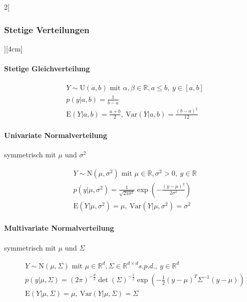 \documentclass[8pt]{extarticle}
\begin{document}
\begin{multicols}{2}[\subsubsection{Stetige Verteilungen}][4cm]

	\paragraph{Stetige Gleichverteilung}
  
    \begin{align*}
    & Y \sim \mathrm{U}(a,b) \text{ mit } \alpha, \beta \in \mathbb{R}, a \le b,\: y \in \left[a,b\right] \\
    & p(y|a,b) =\frac{1}{b-a} \\
    & \mathrm{E}(Y|a,b) = \frac{a+b}{2} ,\: \mathrm{Var}(Y|a,b) = \frac{(b-a)^2}{12}
  \end{align*}
  
    \paragraph{Univariate Normalverteilung} symmetrisch mit $\mu$ und $\sigma^2$
  
    \begin{align*}
    & Y \sim \mathrm{N}(\mu, \sigma^2) \text{ mit } \mu \in \mathbb{R}, \sigma^2 > 0,\: y \in \mathbb{R} \\
    & p(y|\mu, \sigma^2) =\frac{1}{\sqrt{2\pi\sigma^2}} \exp \left(-\frac{(y-\mu)^2}{2 \sigma^2} \right) \\
    & \mathrm{E}(Y|\mu, \sigma^2) = \mu ,\: \mathrm{Var}(Y|\mu, \sigma^2) = \sigma^2
  \end{align*}
  
    \paragraph{Multivariate Normalverteilung} symmetrisch mit $\mu$ und $\Sigma$
  
    \begin{align*}
    & Y \sim \mathrm{N}(\mu, \Sigma) \text{ mit } \mu \in \mathbb{R}^d, \Sigma \in \mathbb{R}^{d\times d} s.p.d.,\: y \in \mathbb{R}^d \\
    & p(y|\mu, \Sigma) = (2\pi)^{-\frac{d}{2}} \det (\Sigma)^{-\frac{1}{2}} \exp \left( -\frac{1}{2}(y-\mu)^{T} \Sigma^{-1}(y-\mu)\right) \\
    & \mathrm{E}(Y|\mu, \Sigma) = \mu ,\: \mathrm{Var}(Y|\mu, \Sigma) = \Sigma
  \end{align*}
  

\end{multicols}
\end{document}
